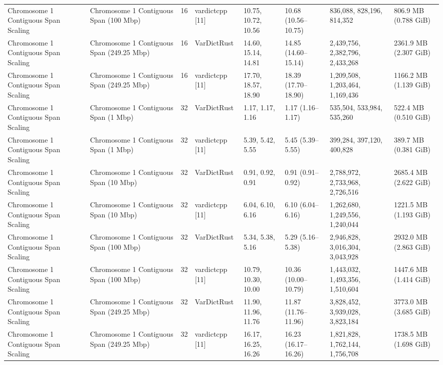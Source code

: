 \begin{table}[htbp]
{\begin{tabular}{llllllll}
Chromosome 1 Contiguous Span Scaling & Chromosome 1 Contiguous Span (100 Mbp) & 16 & vardictcpp [11] & 10.75, 10.72, 10.56 & 10.68 (10.56--10.75) & 836,088, 828,196, 814,352 & 806.9 MB (0.788 GiB) \\
Chromosome 1 Contiguous Span Scaling & Chromosome 1 Contiguous Span (249.25 Mbp) & 16 & VarDictRust & 14.60, 15.14, 14.81 & 14.85 (14.60--15.14) & 2,439,756, 2,382,796, 2,433,268 & 2361.9 MB (2.307 GiB) \\
Chromosome 1 Contiguous Span Scaling & Chromosome 1 Contiguous Span (249.25 Mbp) & 16 & vardictcpp [11] & 17.70, 18.57, 18.90 & 18.39 (17.70--18.90) & 1,209,508, 1,203,464, 1,169,436 & 1166.2 MB (1.139 GiB) \\
Chromosome 1 Contiguous Span Scaling & Chromosome 1 Contiguous Span (1 Mbp) & 32 & VarDictRust & 1.17, 1.17, 1.16 & 1.17 (1.16--1.17) & 535,504, 533,984, 535,260 & 522.4 MB (0.510 GiB) \\
Chromosome 1 Contiguous Span Scaling & Chromosome 1 Contiguous Span (1 Mbp) & 32 & vardictcpp [11] & 5.39, 5.42, 5.55 & 5.45 (5.39--5.55) & 399,284, 397,120, 400,828 & 389.7 MB (0.381 GiB) \\
Chromosome 1 Contiguous Span Scaling & Chromosome 1 Contiguous Span (10 Mbp) & 32 & VarDictRust & 0.91, 0.92, 0.91 & 0.91 (0.91--0.92) & 2,788,972, 2,733,968, 2,726,516 & 2685.4 MB (2.622 GiB) \\
Chromosome 1 Contiguous Span Scaling & Chromosome 1 Contiguous Span (10 Mbp) & 32 & vardictcpp [11] & 6.04, 6.10, 6.16 & 6.10 (6.04--6.16) & 1,262,680, 1,249,556, 1,240,044 & 1221.5 MB (1.193 GiB) \\
Chromosome 1 Contiguous Span Scaling & Chromosome 1 Contiguous Span (100 Mbp) & 32 & VarDictRust & 5.34, 5.38, 5.16 & 5.29 (5.16--5.38) & 2,946,828, 3,016,304, 3,043,928 & 2932.0 MB (2.863 GiB) \\
Chromosome 1 Contiguous Span Scaling & Chromosome 1 Contiguous Span (100 Mbp) & 32 & vardictcpp [11] & 10.79, 10.30, 10.00 & 10.36 (10.00--10.79) & 1,443,032, 1,493,356, 1,510,604 & 1447.6 MB (1.414 GiB) \\
Chromosome 1 Contiguous Span Scaling & Chromosome 1 Contiguous Span (249.25 Mbp) & 32 & VarDictRust & 11.90, 11.96, 11.76 & 11.87 (11.76--11.96) & 3,828,452, 3,939,028, 3,823,184 & 3773.0 MB (3.685 GiB) \\
Chromosome 1 Contiguous Span Scaling & Chromosome 1 Contiguous Span (249.25 Mbp) & 32 & vardictcpp [11] & 16.17, 16.25, 16.26 & 16.23 (16.17--16.26) & 1,821,828, 1,762,144, 1,756,708 & 1738.5 MB (1.698 GiB) \\

\end{tabular}}
\end{table}
